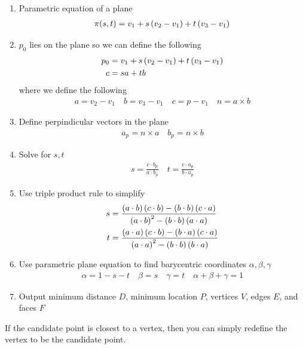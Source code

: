\begin{enumerate}
    \item Parametric equation of a plane
        \begin{align}
            \pi(s, t) = v_1 + s \left( v_2 - v_1 \right) + t \left( v_3 - v_1 \right)
        \end{align}
    \item \( p_0 \) lies on the plane so we can define the following
        \begin{align}
            p_0 &= v_1 + s \left( v_2 - v_1 \right) + t \left( v_3 - v_1 \right) \\
            c &= s a + t b
        \end{align}
        where we define the following
        \begin{align*}
            a = v_2 - v_1 \quad b= v_3- v_1 \quad c = p - v_1 \quad n = a \times b
        \end{align*}
    \item Define perpindicular vectors in the plane
        \begin{align}
            a_p = n \times a \quad b_p = n \times b
        \end{align}
    \item Solve for \( s, t\)
        \begin{align}
            s = \frac{c \cdot b_p}{a \cdot b_p} \quad t = \frac{c \cdot a_p}{b \cdot a_p}
        \end{align}
    \item Use triple product rule to simplify
        \begin{align}
            s &= \frac{\left( a \cdot b \right)\left( c \cdot b \right)-\left( b \cdot b \right) \left( c \cdot a \right)}{\left( a \cdot b \right)^2 - \left( b \cdot b \right) \left(  a \cdot a \right)} \\
            t &=  \frac{\left( a \cdot a \right)\left( c \cdot b \right)-\left( b \cdot a \right) \left( c \cdot a \right)}{\left( a \cdot a \right)^2 - \left( b \cdot b \right) \left(  b \cdot a \right)} \\
        \end{align} 
    \item Use parametric plane equation to find barycentric coordinates \( \alpha, \beta, \gamma\)
        \begin{align}
            \alpha = 1 - s -t \quad \beta = s \quad \gamma = t \quad \alpha + \beta + \gamma = 1
        \end{align}
    \item Output minimum distance \( D\), minimum location \( P \), vertices \( V \), edges \( E\), and faces \( F \)
\end{enumerate}
If the candidate point is closest to a vertex, then you can simply redefine the vertex to be the candidate point.

